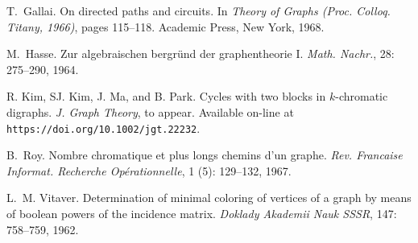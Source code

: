 \documentclass[utf8,10pt]{article}
\theoremstyle{plain}
\theoremstyle{definition}
\theoremstyle{remark}
\begin{document}
\begin{thebibliography}{XX}
T.~Gallai.
\newblock On directed paths and circuits.
\newblock In \emph{Theory of Graphs (Proc. Colloq. Titany, 1966)}, pages
  115--118. Academic Press, New York, 1968.



M.~Hasse.
\newblock Zur algebraischen bergr\"und der graphentheorie {I}.
\newblock \emph{Math. Nachr.}, 28: 275--290, 1964.


R. Kim, SJ. Kim, J. Ma, and B. Park.
\newblock Cycles with two blocks in $k$-chromatic digraphs.
\newblock \emph{J. Graph Theory}, to appear. Available on-line at
{\tt https://doi.org/10.1002/jgt.22232}.


B.~Roy.
\newblock Nombre chromatique et plus longs chemins d'un graphe.
\newblock \emph{Rev. Francaise Informat. Recherche Op\'erationnelle},
  1 (5): 129--132, 1967.



L.~M. Vitaver.
\newblock Determination of minimal coloring of vertices of a graph by means of
  boolean powers of the incidence matrix.
\newblock \emph{Doklady Akademii Nauk SSSR}, 147: 758--759, 1962.




\end{thebibliography}
\end{document}
